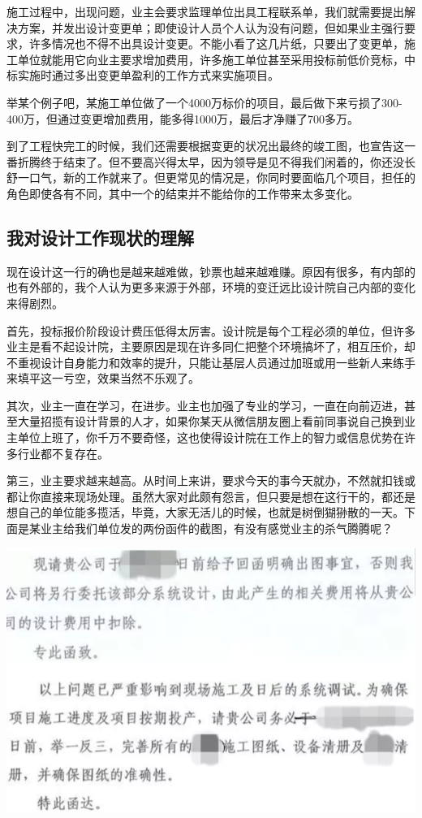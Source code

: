 \documentclass[]{book}
\begin{document}
施工过程中，出现问题，业主会要求监理单位出具工程联系单，我们就需要提出解决方案，并发出设计变更单；即使设计人员个人认为没有问题，但如果业主强行要求，许多情况也不得不出具设计变更。不能小看了这几片纸，只要出了变更单，施工单位就能用它向业主要求增加费用，许多施工单位甚至采用投标前低价竞标，中标实施时通过多出变更单盈利的工作方式来实施项目。

举某个例子吧，某施工单位做了一个4000万标价的项目，最后做下来亏损了300-400万，但通过变更增加费用，能多得1000万，最后才净赚了700多万。

到了工程快完工的时候，我们还需要根据变更的状况出最终的竣工图，也宣告这一番折腾终于结束了。但不要高兴得太早，因为领导是见不得我们闲着的，你还没长舒一口气，新的工作就来了。但更常见的情况是，你同时要面临几个项目，担任的角色即使各有不同，其中一个的结束并不能给你的工作带来太多变化。

\subsection{我对设计工作现状的理解}

现在设计这一行的确也是越来越难做，钞票也越来越难赚。原因有很多，有内部的也有外部的，我个人认为更多来源于外部，环境的变迁远比设计院自己内部的变化来得剧烈。

首先，投标报价阶段设计费压低得太厉害。设计院是每个工程必须的单位，但许多业主是看不起设计院，主要原因是现在许多同仁把整个环境搞坏了，相互压价，却不重视设计自身能力和效率的提升，只能让基层人员通过加班或用一些新人来练手来填平这一亏空，效果当然不乐观了。

其次，业主一直在学习，在进步。业主也加强了专业的学习，一直在向前迈进，甚至大量招揽有设计背景的人才，如果你某天从微信朋友圈上看前同事说自己换到业主单位上班了，你千万不要奇怪，这也使得设计院在工作上的智力或信息优势在许多行业都不复存在。

第三，业主要求越来越高。从时间上来讲，要求今天的事今天就办，不然就扣钱或都让你直接来现场处理。虽然大家对此颇有怨言，但只要是想在这行干的，都还是想自己的单位能多揽活，毕竟，大家无活儿的时候，也就是树倒猢狲散的一天。下面是某业主给我们单位发的两份函件的截图，有没有感觉业主的杀气腾腾呢？

\includegraphics[width=8.33in]{images/sisi4}
\end{document}

